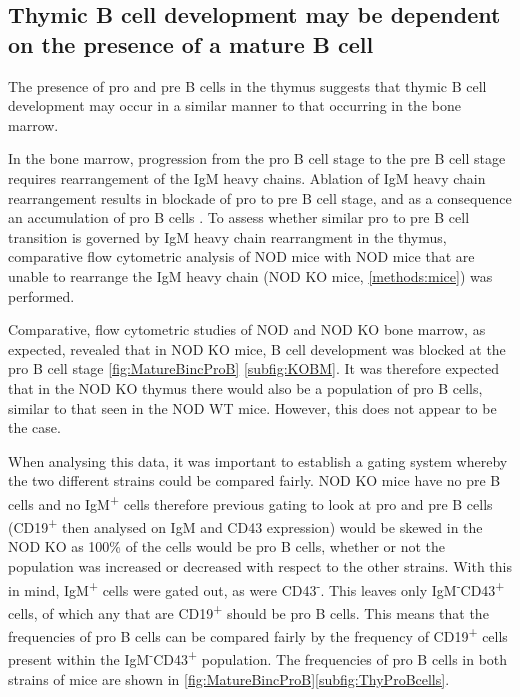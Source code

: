 \subsection{Thymic B cell development may be dependent on the presence of a mature B cell}


The presence of pro and pre B cells in the thymus suggests that thymic B cell development may occur in a similar manner to that occurring in the bone marrow.

In the bone marrow, progression from the pro B cell stage to the pre B cell stage requires rearrangement of the IgM heavy chains.
Ablation of IgM heavy chain rearrangement results in blockade of pro to pre B cell stage, and as a consequence an accumulation of pro B cells .
To assess whether similar pro to pre B cell transition is governed by IgM heavy chain rearrangment in the thymus, comparative flow cytometric analysis of NOD mice with NOD mice that are unable to rearrange the IgM heavy chain (NOD KO mice, \cref{methods:mice}) was performed. 

Comparative, flow cytometric studies of NOD and NOD KO bone marrow, as expected, revealed that in NOD KO mice, B cell development was blocked at the pro B cell stage \cref{fig:MatureBincProB} \ref{subfig:KOBM}.
It was therefore expected that in the NOD KO thymus there would also be a population of pro B cells, similar to that seen in the NOD WT mice. 
However, this does not appear to be the case.

When analysing this data, it was important to establish a gating system whereby the two different strains could be compared fairly.
NOD KO mice have no pre B cells and no IgM\textsuperscript{+} cells therefore previous gating to look at pro and pre B cells (CD19\textsuperscript{+} then analysed on IgM and CD43 expression) would be skewed in the NOD KO as 100\% of the cells would be pro B cells, whether or not the population was increased or decreased with respect to the other strains.
With this in mind, IgM\textsuperscript{+} cells were gated out, as were CD43\textsuperscript{-}.
This leaves only IgM\textsuperscript{-}CD43\textsuperscript{+} cells, of which any that are CD19\textsuperscript{+} should be pro B cells.
This means that the frequencies of pro B cells can be compared fairly by the frequency of CD19\textsuperscript{+} cells present within the IgM\textsuperscript{-}CD43\textsuperscript{+} population.
The frequencies of pro B cells in both strains of mice are shown in \cref{fig:MatureBincProB}\ref{subfig:ThyProBcells}.



